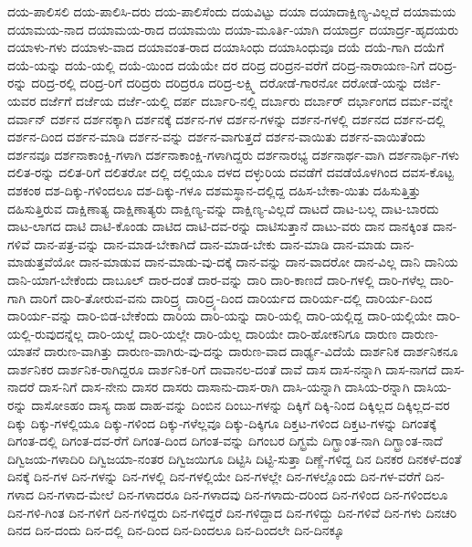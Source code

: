 {ದಯ-ಪಾಲಿಸಲಿ
ದಯ-ಪಾಲಿಸಿ-ದರು
ದಯ-ಪಾಲಿಸೆಂದು
ದಯವಿಟ್ಟು
ದಯಾ
ದಯಾದಾಕ್ಷಿಣ್ಯ-ವಿಲ್ಲದೆ
ದಯಾಮಯ
ದಯಾಮಯ-ನಾದ
ದಯಾಮಯ-ರಾದ
ದಯಾಮಯಿ
ದಯಾ-ಮೂರ್ತಿ-ಯಾಗಿ
ದಯಾರ್ದ್ರ
ದಯಾರ್ದ್ರ-ಹೃದಯರು
ದಯಾಳು-ಗಳು
ದಯಾಳು-ವಾದ
ದಯಾವಂತ-ರಾದ
ದಯಾಸಿಂಧು
ದಯಾಸಿಂಧುವೂ
ದಯೆ
ದಯೆ-ಗಾಗಿ
ದಯೆಗೆ
ದಯೆ-ಯನ್ನು
ದಯೆ-ಯಲ್ಲಿ
ದಯೆ-ಯಿಂದ
ದಯೆಯೇ
ದರ
ದರಿದ್ರ
ದರಿದ್ರನ-ವರೆಗೆ
ದರಿದ್ರ-ನಾರಾಯಣ-ನಿಗೆ
ದರಿದ್ರ-ರನ್ನು
ದರಿದ್ರ-ರಲ್ಲಿ
ದರಿದ್ರ-ರಿಗೆ
ದರಿದ್ರರು
ದರಿದ್ರರೂ
ದರಿದ್ರ-ಲಕ್ಷ್ಮಿ
ದರೋಡೆ-ಗಾರನೋ
ದರೋಡೆ-ಯನ್ನು
ದರ್ಜಿ-ಯವರ
ದರ್ಜೆಗೆ
ದರ್ಜೆಯ
ದರ್ಜೆ-ಯಲ್ಲಿ
ದರ್ಪ
ದರ್ಬಾರಿ-ನಲ್ಲಿ
ದರ್ಬಾರು
ದರ್ಬಾರ್
ದರ್ಭಾಂಗದ
ದರ್ಮ-ವನ್ನೇ
ದರ್ವಾನ್
ದರ್ಶನ
ದರ್ಶನಕ್ಕಾಗಿ
ದರ್ಶನಕ್ಕೆ
ದರ್ಶನ-ಗಳ
ದರ್ಶನ-ಗಳನ್ನು
ದರ್ಶನ-ಗಳಲ್ಲಿ
ದರ್ಶನದ
ದರ್ಶನ-ದಲ್ಲಿ
ದರ್ಶನ-ದಿಂದ
ದರ್ಶನ-ಮಾಡಿ
ದರ್ಶನ-ವನ್ನು
ದರ್ಶನ-ವಾಗುತ್ತದೆ
ದರ್ಶನ-ವಾಯಿತು
ದರ್ಶನ-ವಾಯಿತೆಂದು
ದರ್ಶನವೂ
ದರ್ಶನಾಕಾಂಕ್ಷಿ-ಗಳಾಗಿ
ದರ್ಶನಾಕಾಂಕ್ಷಿ-ಗಳಾಗಿದ್ದರು
ದರ್ಶನಾರಭ್ಯ
ದರ್ಶನಾರ್ಥ-ವಾಗಿ
ದರ್ಶನಾರ್ಥಿ-ಗಳು
ದಲಿತ-ರನ್ನು
ದಲಿತ-ರಿಗೆ
ದಲಿತರೋ
ದಲ್ಲಿ
ದಲ್ಲಿಯೂ
ದಳದ
ದಳ್ಳುರಿಯ
ದವಡೆಗೆ
ದವಡೆಯೊಳಗಿಂದ
ದವಸ-ಕೊಟ್ಟ
ದಶಕಂಠ
ದಶ-ದಿಕ್ಕು-ಗಳಿಂದಲೂ
ದಶ-ದಿಕ್ಕು-ಗಳೂ
ದಶಮಸ್ಥಾನ-ದಲ್ಲಿದ್ದ
ದಹಿಸ-ಬೇಕಾ-ಯಿತು
ದಹಿಸುತ್ತಿತ್ತು
ದಹಿಸುತ್ತಿರುವ
ದಾಕ್ಷಿಣಾತ್ಯ
ದಾಕ್ಷಿಣಾತ್ಯರು
ದಾಕ್ಷಿಣ್ಯ-ವನ್ನು
ದಾಕ್ಷಿಣ್ಯ-ವಿಲ್ಲದೆ
ದಾಟದೆ
ದಾಟ-ಬಲ್ಲ
ದಾಟ-ಬಾರದು
ದಾಟ-ಲಾಗದ
ದಾಟಿ
ದಾಟಿ-ಕೊಂಡು
ದಾಟಿದ
ದಾಟಿ-ದವ-ರನ್ನು
ದಾಟಿಸುತ್ತಾನೆ
ದಾಟು-ವರು
ದಾನ
ದಾನಕ್ಕಿಂತ
ದಾನ-ಗಳಿವೆ
ದಾನ-ಪತ್ರ-ವನ್ನು
ದಾನ-ಮಾಡ-ಬೇಕಾಗಿದೆ
ದಾನ-ಮಾಡ-ಬೇಕು
ದಾನ-ಮಾಡಿ
ದಾನ-ಮಾಡು
ದಾನ-ಮಾಡುತ್ತವೆಯೋ
ದಾನ-ಮಾಡುವ
ದಾನ-ಮಾಡು-ವು-ದಕ್ಕೆ
ದಾನ-ವನ್ನು
ದಾನ-ವಾದರೋ
ದಾನ-ವಿಲ್ಲ
ದಾನಿ
ದಾನಿಯ
ದಾನಿ-ಯಾಗ-ಬೇಕೆಂದು
ದಾಬೂಲ್
ದಾರ-ದಂತೆ
ದಾರ-ವನ್ನು
ದಾರಿ
ದಾರಿ-ಕಾಣದೆ
ದಾರಿ-ಗಳಲ್ಲಿ
ದಾರಿ-ಗಳೆಲ್ಲ
ದಾರಿ-ಗಾಗಿ
ದಾರಿಗೆ
ದಾರಿ-ತೋರುವ-ವನು
ದಾರಿದ್ರ್ಯ
ದಾರಿದ್ರ್ಯ-ದಿಂದ
ದಾರಿರ್ಯದ
ದಾರಿರ್ಯ-ದಲ್ಲಿ
ದಾರಿರ್ಯ-ದಿಂದ
ದಾರಿರ್ಯ-ವನ್ನು
ದಾರಿ-ಬಿಡ-ಬೇಕೆಂದು
ದಾರಿಯ
ದಾರಿ-ಯನ್ನು
ದಾರಿ-ಯಲ್ಲಿ
ದಾರಿ-ಯಲ್ಲಿದ್ದ
ದಾರಿ-ಯಲ್ಲಿಯೇ
ದಾರಿ-ಯಲ್ಲಿ-ರುವುದನ್ನೆಲ್ಲ
ದಾರಿ-ಯಲ್ಲೆ
ದಾರಿ-ಯಲ್ಲೇ
ದಾರಿ-ಯೆಲ್ಲ
ದಾರಿಯೇ
ದಾರಿ-ಹೋಕನಿಗೂ
ದಾರುಣ
ದಾರುಣ-ಯಾತನೆ
ದಾರುಣ-ವಾಗಿತ್ತು
ದಾರುಣ-ವಾಗಿರು-ವು-ದನ್ನು
ದಾರುಣ-ವಾದ
ದಾರ್ಢ್ಯ-ವಿದೆಯೆ
ದಾರ್ಶನಿಕ
ದಾರ್ಶನಿಕನೂ
ದಾರ್ಶನಿಕರ
ದಾರ್ಶನಿಕ-ರಾಗಿದ್ದರೂ
ದಾರ್ಶನಿಕ-ರಿಗೆ
ದಾವಾನಲ-ದಂತೆ
ದಾವೆ
ದಾಸ
ದಾಸ-ನನ್ನಾಗಿ
ದಾಸ-ನಾಗದೆ
ದಾಸ-ನಾದರೆ
ದಾಸ-ನಿಗೆ
ದಾಸ-ನೇನು
ದಾಸರ
ದಾಸರು
ದಾಸಾನು-ದಾಸ-ರಾಗಿ
ದಾಸಿ-ಯನ್ನಾಗಿ
ದಾಸಿಯ-ರನ್ನಾಗಿ
ದಾಸಿಯ-ರನ್ನು
ದಾಸೋಽಹಂ
ದಾಸ್ಯ
ದಾಹ
ದಾಹ-ವನ್ನು
ದಿಂಬಿನ
ದಿಂಬು-ಗಳನ್ನು
ದಿಕ್ಕಿಗೆ
ದಿಕ್ಕಿ-ನಿಂದ
ದಿಕ್ಕಿಲ್ಲದ
ದಿಕ್ಕಿಲ್ಲದ-ವರ
ದಿಕ್ಕು
ದಿಕ್ಕು-ಗಳಲ್ಲಿಯೂ
ದಿಕ್ಕು-ಗಳಿಂದ
ದಿಕ್ಕು-ಗಳೆಲ್ಲವೂ
ದಿಕ್ಕು-ದಿಕ್ಕಿಗೂ
ದಿಕ್ತಟ-ಗಳಿಂದ
ದಿಕ್ತಟ-ಗಳನ್ನು
ದಿಗಂತಕ್ಕೆ
ದಿಗಂತ-ದಲ್ಲಿ
ದಿಗಂತ-ದವ-ರೆಗೆ
ದಿಗಂತ-ದಿಂದ
ದಿಗಂತ-ವನ್ನು
ದಿಗಂಬರ
ದಿಗ್ಭ್ರಮೆ
ದಿಗ್ಭ್ರಾಂತ-ನಾಗಿ
ದಿಗ್ಭ್ರಾಂತ-ನಾದೆ
ದಿಗ್ವಿಜಯ-ಗಳಾದಿರಿ
ದಿಗ್ವಿಜಯಾ-ನಂತರ
ದಿಗ್ವಿಜಯಿಗೂ
ದಿಟ್ಟಿಸಿ
ದಿಟ್ಟಿ-ಸುತ್ತಾ
ದಿಣ್ಣೆ-ಗಳಿದ್ದ
ದಿನ
ದಿನಕರ
ದಿನಕಳೆ-ದಂತೆ
ದಿನಕ್ಕೆ
ದಿನ-ಗಳ
ದಿನ-ಗಳನ್ನು
ದಿನ-ಗಳಲ್ಲಿ
ದಿನ-ಗಳಲ್ಲಿಯೇ
ದಿನ-ಗಳಲ್ಲೇ
ದಿನ-ಗಳಲ್ಲೊಂದು
ದಿನ-ಗಳ-ವರೆಗೆ
ದಿನ-ಗಳಾದ
ದಿನ-ಗಳಾದ-ಮೇಲೆ
ದಿನ-ಗಳಾದರೂ
ದಿನ-ಗಳಾದವು
ದಿನ-ಗಳಾದು-ದರಿಂದ
ದಿನ-ಗಳಿಂದ
ದಿನ-ಗಳಿಂದಲೂ
ದಿನ-ಗಳಿ-ಗಿಂತ
ದಿನ-ಗಳಿಗೆ
ದಿನ-ಗಳಿದ್ದರು
ದಿನ-ಗಳಿದ್ದರೆ
ದಿನ-ಗಳಿದ್ದಾದ
ದಿನ-ಗಳಿದ್ದು
ದಿನ-ಗಳಿವೆ
ದಿನ-ಗಳು
ದಿನಚರಿ
ದಿನದ
ದಿನ-ದಂದು
ದಿನ-ದಲ್ಲಿ
ದಿನ-ದಿಂದ
ದಿನ-ದಿಂದಲೂ
ದಿನ-ದಿಂದಲೇ
ದಿನ-ದಿನಕ್ಕೂ
}
